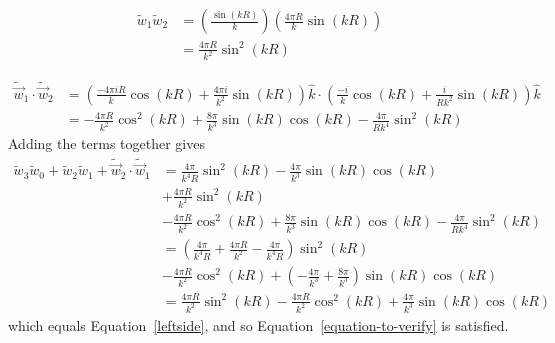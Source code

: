 \documentclass[double,12pt]{beavtex}
\begin{document}
\begin{align}
    \widetilde{w}_1\widetilde{w}_2 &= \left(\frac{\sin (kR)}{k}\right)\left(\frac{4\pi R}{k} \sin (kR)\right) \nonumber  \\                                
                                   &= \frac{4\pi R}{k^2}\sin^2 (kR)
\end{align}

\begin{align}
   \widetilde{\vec w}_1\cdot\widetilde{\vec w}_2   
    &= \left(\frac{-4\pi iR}{k}\cos (kR)+ \frac{4\pi i}{k^2}\sin (kR)\right)\hat k \cdot \left(\frac{-i}{k}\cos (kR)+ \frac{i}{Rk^2}\sin (kR)\right) \hat k  \nonumber  \\
    &= -\frac{4\pi R}{k^2}\cos^2(kR) + \frac{8\pi}{k^3}\sin(kR)\cos(kR) - \frac{4\pi}{Rk^4}\sin^2(kR)
\end{align}
Adding the terms together gives
\begin{align}
    \widetilde{w}_3\widetilde{w}_0 + \widetilde{w}_2\widetilde{w}_1 + \widetilde{\vec w}_2 \cdot \widetilde{\vec w}_1 
    &= \frac{4\pi}{k^4R}\sin^2 (kR) - \frac{4\pi}{k^3}\sin(kR)\cos(kR) \nonumber  \\
    &+ \frac{4\pi R}{k^2}\sin^2 (kR) \nonumber  \\
    &- \frac{4\pi R}{k^2}\cos^2(kR) + \frac{8\pi}{k^3}\sin(kR)\cos(kR) -  \frac{4\pi}{Rk^4}\sin^2(kR) \nonumber  \\                                                                                                                     
    &= \left(\frac{4\pi}{k^4R}+\frac{4\pi R}{k^2}-\frac{4\pi}{k^4R}\right)\sin^2(kR) \nonumber   \\
    &-\frac{4\pi R}{k^2}\cos^2(kR) +\left(-\frac{4\pi}{k^3} + \frac{8\pi}{k^3}\right)\sin(kR)\cos(kR) \nonumber   \\                                                                                                                  
    &=\frac{4\pi R}{k^2}\sin^2(kR)-\frac{4\pi R}{k^2}\cos^2(kR)+\frac{4\pi}{k^3}\sin(kR)\cos(kR)
\end{align}
which equals Equation~\ref{leftside}, and so
Equation~\ref{equation-to-verify} is satisfied.
\end{document}
